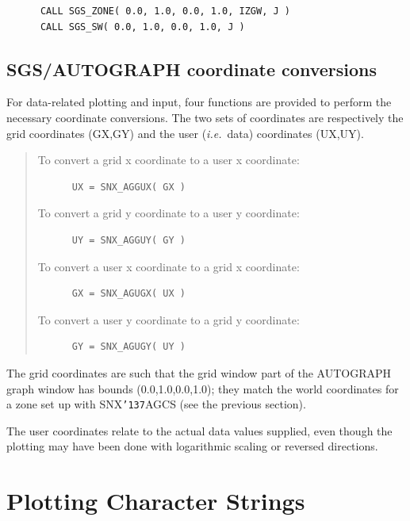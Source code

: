 \documentclass[11pt]{article}
\renewcommand{\_}{{\tt\char'137}}     %
\begin{document}
\begin{verbatim}
      CALL SGS_ZONE( 0.0, 1.0, 0.0, 1.0, IZGW, J )
      CALL SGS_SW( 0.0, 1.0, 0.0, 1.0, J )
\end{verbatim}


\subsection {SGS/AUTOGRAPH coordinate conversions}

For data-related plotting and input, four functions are
provided to perform the necessary coordinate conversions.
The two sets of coordinates are respectively the grid
coordinates (GX,GY) and the user ({\em i.e.}\ data) coordinates (UX,UY).

\begin{quote}
To convert a grid x coordinate to a user x coordinate:

\begin{verbatim}
      UX = SNX_AGGUX( GX )
\end{verbatim}

To convert a grid y coordinate to a user y coordinate:

\begin{verbatim}
      UY = SNX_AGGUY( GY )
\end{verbatim}

To convert a user x coordinate to a grid x coordinate:

\begin{verbatim}
      GX = SNX_AGUGX( UX )
\end{verbatim}

To convert a user y coordinate to a grid y coordinate:

\begin{verbatim}
      GY = SNX_AGUGY( UY )
\end{verbatim}
\end{quote}

The grid coordinates are such that the grid window part of
the AUTOGRAPH graph window has bounds (0.0,1.0,0.0,1.0);
they match the world coordinates for a zone set up with SNX\_AGCS
(see the previous section).

The user coordinates relate to the actual data values
supplied, even though the plotting may have been done with
logarithmic scaling or reversed directions.


\section {Plotting Character Strings}
\end{document}
